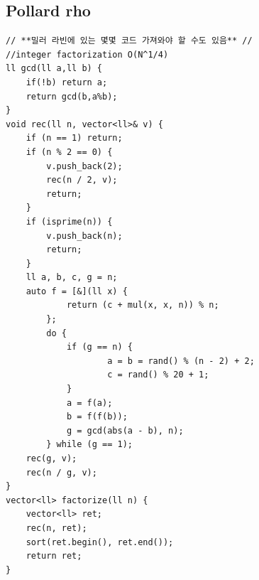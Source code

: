 \documentclass[landscape, 8pt, a4paper, oneside, twocolumn]{extarticle}
\begin{document}
\subsection{Pollard rho}
\begin{verbatim}
// **밀러 라빈에 있는 몇몇 코드 가져와야 할 수도 있음** //
//integer factorization O(N^1/4)
ll gcd(ll a,ll b) {
    if(!b) return a;
    return gcd(b,a%b);
}
void rec(ll n, vector<ll>& v) {
    if (n == 1) return;
    if (n % 2 == 0) {
        v.push_back(2);
        rec(n / 2, v);
        return;
    }
    if (isprime(n)) {
        v.push_back(n);
        return;
    }
    ll a, b, c, g = n;
    auto f = [&](ll x) {
            return (c + mul(x, x, n)) % n;
        };
        do {
            if (g == n) {
                    a = b = rand() % (n - 2) + 2;
                    c = rand() % 20 + 1;
            }
            a = f(a);
            b = f(f(b));
            g = gcd(abs(a - b), n);
        } while (g == 1);
    rec(g, v);
    rec(n / g, v);
}
vector<ll> factorize(ll n) {
    vector<ll> ret;
    rec(n, ret);
    sort(ret.begin(), ret.end());
    return ret;
}
\end{verbatim}
\end{document}
